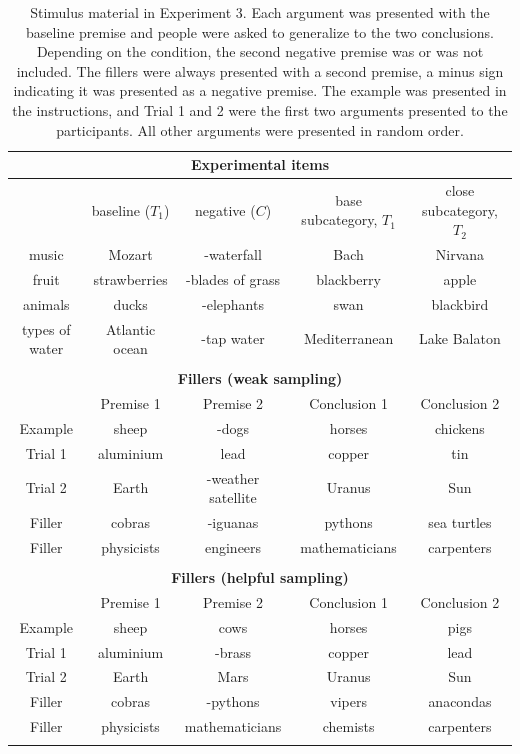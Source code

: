 \documentclass[authoryear,11pt]{elsarticle}
\begin{document}
\begin{table}[t]
\scriptsize
\begin{center}
\caption{Stimulus material in Experiment 3. Each argument was presented with the {\sc baseline} premise and people were asked to generalize to the two conclusions. Depending on the condition, the second {\sc negative} premise was or was not included. The fillers were always presented with a second premise, a minus sign indicating it was presented as a negative premise. The example was presented in the instructions, and Trial 1 and 2 were the first two arguments presented to the participants. All other arguments were presented in random order.}
\label{table:stimexp3}
\vskip 0.12in
\begin{tabular}{|c|cc|cc|}
\multicolumn{5}{c}{\textbf{Experimental items}}\\
\hline
& {\sc baseline ($T_1$)} & {\sc negative ($C$)} & base subcategory, $T_1$ & close subcategory, $T_2$ \\
\hline
music & Mozart & -waterfall & Bach & Nirvana\\
fruit & strawberries & -blades of grass & blackberry & apple\\
animals & ducks & -elephants & swan & blackbird\\
types of water & Atlantic ocean & -tap water & Mediterranean & Lake Balaton\\
\hline \multicolumn{5}{c}{ } \\
\multicolumn{5}{c}{\textbf{Fillers (weak sampling)}}\\
\hline
& Premise 1 &  Premise 2  & Conclusion 1 & Conclusion 2 \\
\hline
Example & sheep & -dogs & horses & chickens\\
Trial 1 & aluminium & lead & copper & tin\\
Trial 2 & Earth & -weather satellite & Uranus & Sun\\
Filler & cobras & -iguanas & pythons & sea turtles\\
Filler & physicists & engineers & mathematicians & carpenters\\
\hline  \multicolumn{5}{c}{ } \\
\multicolumn{5}{c}{\textbf{Fillers (helpful sampling)}}\\
\hline
& Premise 1 &  Premise 2 & Conclusion 1 & Conclusion 2 \\
\hline
Example & sheep & cows & horses & pigs\\
Trial 1 & aluminium & -brass & copper & lead\\
Trial 2 & Earth & Mars & Uranus & Sun\\
Filler  & cobras & -pythons & vipers & anacondas\\
Filler & physicists & mathematicians & chemists & carpenters \\
\hline \multicolumn{5}{c}{ }
\end{tabular}
\end{center}
\end{table}
\end{document}

